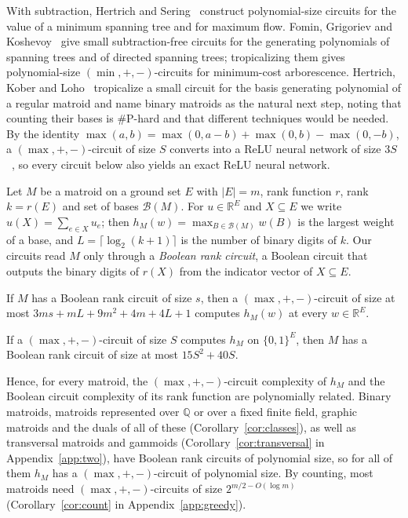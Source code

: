 \documentclass[runningheads,envcountsame]{llncs}
\newcommand{\R}{\mathbb R}
\newcommand{\Bases}{\mathcal B}
\begin{document}
With subtraction, Hertrich and Sering~\cite{hertrich-sering25} construct
polynomial-size circuits for the value of a minimum spanning tree and
for maximum flow.  Fomin, Grigoriev and Koshevoy~\cite{fgk16} give small
subtraction-free circuits for the generating polynomials of spanning trees and of
directed spanning trees; tropicalizing them gives polynomial-size
$(\min,+,-)$-circuits for minimum-cost arborescence.  Hertrich,
Kober and Loho~\cite{hertrich-kober-loho26} tropicalize a small circuit for the
basis generating polynomial of a regular matroid and name binary matroids as the
natural next step, noting that counting their bases is \#P-hard and that
different techniques would be needed.  By the identity
$\max(a,b)=\max(0,a-b)+\max(0,b)-\max(0,-b)$, a $(\max,+,-)$-circuit of size $S$
converts into a ReLU neural network of size $3S$~\cite{hertrich-kober-loho26},
so every circuit below also yields an exact ReLU neural network.

Let $M$ be a matroid on a ground set $E$ with $|E|=m$, rank function $r$,
rank $k=r(E)$ and set of bases $\Bases(M)$.  For $u\in\R^{E}$ and $X\subseteq E$ we
write $u(X)=\sum_{e\in X}u_e$; then $h_M(w)=\max_{B\in\Bases(M)}w(B)$ is the largest
weight of a base, and $L=\lceil\log_2(k+1)\rceil$ is the number of binary digits of
$k$.  Our circuits read
$M$ only through a \emph{Boolean rank circuit}, a Boolean circuit that outputs
the binary digits of $r(X)$ from the indicator vector of $X\subseteq E$.

\begin{mainthm}
\label{thm:A}
If $M$ has a Boolean rank circuit of size $s$, then a $(\max,+,-)$-circuit of
size at most $3ms+mL+9m^{2}+4m+4L+1$ computes $h_M(w)$ at every $w\in\R^{E}$.
\end{mainthm}

\begin{mainthm}[Converse]
\label{thm:B}
If a $(\max,+,-)$-circuit of size $S$ computes $h_M$ on $\{0,1\}^{E}$, then $M$
has a Boolean rank circuit of size at most $15S^{2}+40S$.
\end{mainthm}

Hence, for every matroid, the $(\max,+,-)$-circuit complexity of $h_M$ and the
Boolean circuit complexity of its rank function are polynomially related.
Binary matroids,
matroids represented over $\mathbb Q$ or over a fixed finite field, graphic
matroids and the duals of all of these (Corollary~\ref{cor:classes}), as well as
transversal matroids and gammoids (Corollary~\ref{cor:transversal} in
Appendix~\ref{app:two}), have Boolean rank circuits of polynomial size, so for
all of them $h_M$ has a $(\max,+,-)$-circuit of polynomial size.  By counting, most
matroids need $(\max,+,-)$-circuits of size $2^{m/2-O(\log m)}$
(Corollary~\ref{cor:count} in Appendix~\ref{app:greedy}).
\end{document}
